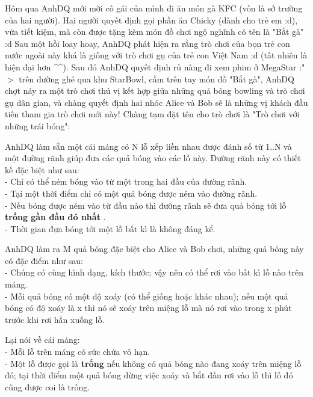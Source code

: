 







   Hôm qua AnhDQ mới mời cô gái của mình đi ăn món gà KFC (vốn là sở trường của hai người). Hai người quyết định gọi phần ăn Chicky (dành cho trẻ em :d), vừa tiết kiệm, mà còn được tặng kèm món đồ chơi ngộ nghĩnh có tên là "Bắt gà" :d Sau một hồi loay hoay, AnhDQ phát hiện ra rằng trò chơi của bọn trẻ con nước ngoài này khá là giống với trò chơi gụ của trẻ con Việt Nam :d (tất nhiên là hiện đại hơn \textasciicircum\textasciicircum). Sau đó AnhDQ quyết định rủ nàng đi xem phim ở MegaStar :"$>$ trên đường ghé qua khu StarBowl, cầm trên tay món đồ "Bắt gà", AnhDQ chợt nảy ra một trò chơi thú vị kết hợp giữa những quả bóng bowling và trò chơi gụ dân gian, và chàng quyết định hai nhóc Alice và Bob sẽ là những vị khách đầu tiên tham gia trò chơi mới này! Chàng tạm đặt tên cho trò chơi là "Trò chơi với những trái bóng":  

   AnhDQ làm sẵn một cái máng có N lỗ xếp liền nhau được đánh số từ 1..N và một đường rãnh giúp đưa các quả bóng vào các lỗ này. Đường rãnh này có thiết kế đặc biệt như sau:   
\\   - Chỉ có thể ném bóng vào từ một trong hai đầu của đường rãnh.   
\\   - Tại một thời điểm chỉ có một quả bóng được ném vào đường rãnh.   
\\   - Nếu bóng được ném vào từ đầu nào thì đường rãnh sẽ đưa quả bóng tới lỗ   \textbf{    trống gần đầu đó nhất   }   .   
\\   - Thời gian đưa bóng tới một lỗ bất kì là không đáng kể.  

   AnhDQ làm ra M quả bóng đặc biệt cho Alice và Bob chơi, những quả bóng này có đặc điểm như sau:   
\\   - Chúng có cùng hình dạng, kích thước; vậy nên có thể rơi vào bất kì lỗ nào trên máng.   
\\   - Mỗi quả bóng có một độ xoáy (có thể giống hoặc khác nhau); nếu một quả bóng có độ xoáy là x thì nó sẽ xoáy trên miệng lỗ mà nó rơi vào trong x phút trước khi rơi hẳn xuống lỗ.  

   Lại nói về cái máng:   
\\   - Mỗi lỗ trên máng có sức chứa vô hạn.   
\\   - Một lỗ được gọi là   \textbf{    trống   }   nếu không có quả bóng nào đang xoáy trên miệng lỗ đó; tại thời điểm một quả bóng dừng việc xoáy và bắt đầu rơi vào lỗ thì lỗ đó cũng được coi là trống.  

